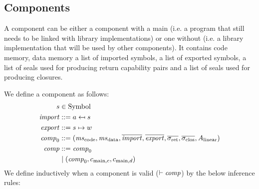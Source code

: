 \documentclass[a4paper]{article}
\begin{document}
\subsection{Components}
\label{sec:components}

A component can be either a component with a main (i.e. a program that still needs to be linked with library implementations) or one without (i.e. a library implementation that will be used by other components). 
It contains code memory, data memory a list of imported symbols, a list of exported symbols, a list of seals used for producing return capability pairs and a list of seals used for producing closures.

We define a component as follows:
\begin{align*}
  s &\in \Symbol\\
  \var{import} &\mathrel{::=} a \mapsfrom s\\
  \var{export} &\mathrel{::=} s \mapsto w\\
  \var{comp}_0 &\mathrel{::=} (\mscode,\msdata,\overline{\var{import}},\overline{\var{export}},\sigrets,\sigcloss,A_\linear)\\
  \var{comp} &\mathrel{::=} \var{comp}_0\\
               &\mid  (\var{comp}_0,c_{\mathrm{main},c}, c_{\mathrm{main},d})
\end{align*}
\clearpage
We define inductively when a component is valid ($\vdash \mathit{comp}$) by the below inference rules:
\end{document}
